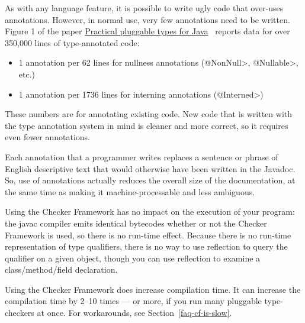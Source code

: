As with any language feature, it is possible to write ugly code that
over-uses annotations.  However, in normal use, very few annotations need
to be written.  Figure 1 of the paper
\href{https://homes.cs.washington.edu/~mernst/pubs/pluggable-checkers-issta2008-abstract.html}{Practical
  pluggable types for Java}~\cite{PapiACPE2008} reports data for over
350,000 lines of type-annotated code:

\begin{itemize}
\item
    1 annotation per 62 lines for nullness annotations (\<@NonNull>, \<@Nullable>, etc.)
\item
    1 annotation per 1736 lines for interning annotations (\<@Interned>)
\end{itemize}


These numbers are for annotating existing code.  New code that
is written with the type annotation system in mind is cleaner and more
correct, so it requires even fewer annotations.

Each annotation that a programmer writes replaces a sentence or phrase of
English descriptive text that would otherwise have been written in the
Javadoc.  So, use of annotations actually reduces the overall size of the
documentation, at the same time as making it machine-processable
and less ambiguous.



Using the Checker Framework has no impact on the execution of your program:
the javac compiler emits identical bytecodes whether or not the Checker
Framework is used, so there is no run-time effect.  Because there is no run-time
representation of type qualifiers, there is no way to use reflection to
query the qualifier on a given object, though you can use reflection to
examine a class/method/field declaration.

Using the Checker Framework does increase compilation time.
It can increase the compilation time by 2--10 times --- or more, if you run
many pluggable type-checkers at once.  For workarounds, see
Section~\ref{faq-cf-is-slow}.



